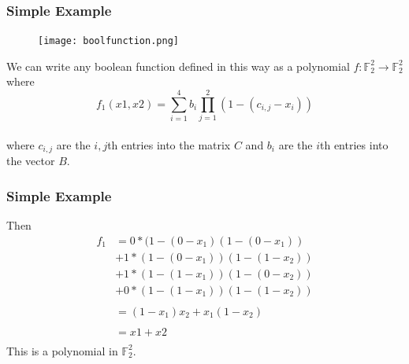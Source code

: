 \documentclass{beamer}
\begin{document}
\begin{frame}
	\frametitle{Simple Example}
	\vspace{-20pt}
	\begin{figure}
	\centering
		\texttt{[image: boolfunction.png]}
	\end{figure}
	We can write any boolean function defined in this way as a polynomial $f:\mathbb{F}_2^2\rightarrow\mathbb{F}_2^2$ where\\
	\begin{equation*}
		 f_1(x1,x2) = \sum_{i=1}^4 b_i \prod_{j=1}^2 (1 - (c_{i,j} - x_i))
	\end{equation*}\\
	where $c_{i,j}$ are the $i,j$th entries into the matrix {\color{red}$C$} and $b_i$ are the $i$th entries into the vector {\color{blue}$B$}.\\
\end{frame}

\begin{frame}
	\frametitle{Simple Example}
	Then
	\begin{align*}
	f_1 &= 0*(1-(0-x_1)(1-(0-x_1)) \\
	&+ 1*(1-(0-x_1))(1-(1-x_2)) \\
	&+ 1*(1-(1-x_1))(1-(0-x_2)) \\
	&+ 0*(1-(1-x_1))(1-(1-x_2))\\ \\
	&= (1-x_1)x_2 + x_1(1-x_2)\\ \\
	&= x1+x2\\ 
	\end{align*}
	This is a polynomial in $\mathbb{F}_2^2$.
\end{frame}
\end{document}
